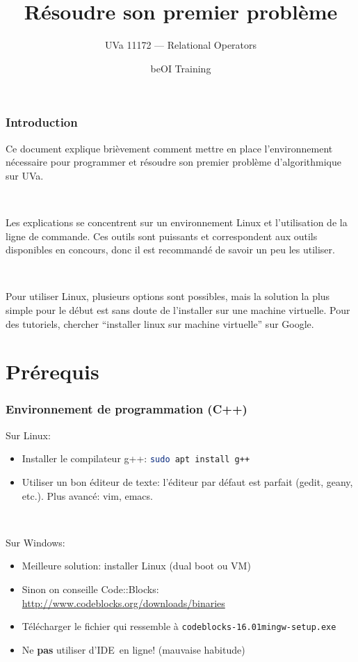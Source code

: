 \documentclass[12pt]{beamer}
\title{Résoudre son premier problème}
\subtitle{UVa 11172 --- Relational Operators}
\author{beOI Training}
\institute{\texttt{[image: ../share/beoi-logo]}}
\date{}
\newcommand{\urlb}[1]{{\color{linkblue}\url{#1}}}
\begin{document}
\maketitle

\begin{frame}
\frametitle{Introduction}
Ce document explique brièvement comment mettre en place l'environnement nécessaire pour programmer et résoudre son premier problème d'algorithmique sur UVa.

~

Les explications se concentrent sur un environnement Linux et l'utilisation de la ligne de commande. Ces outils sont puissants et correspondent aux outils disponibles en concours, donc il est recommandé de savoir un peu les utiliser.

~

Pour utiliser Linux, plusieurs options sont possibles, mais la solution la plus simple pour le début est sans doute de l'installer sur une machine virtuelle. Pour des tutoriels, chercher ``installer linux sur machine virtuelle'' sur Google.
\end{frame}


\section{Prérequis}

\edef\hc{\string:}
\begin{frame}
\frametitle{Environnement de programmation (C++)}
Sur Linux:
\begin{itemize}
\item Installer le compilateur g++: \lstinline[language=bash]|sudo apt install g++|
\item Utiliser un bon éditeur de texte: l'éditeur par défaut est parfait (gedit, geany, etc.). Plus avancé: vim, emacs.
\end{itemize}

~

Sur Windows:
\begin{itemize}
\item Meilleure solution: installer Linux (dual boot ou VM)
\item Sinon on conseille Code\hc\hc{}Blocks: \urlb{http://www.codeblocks.org/downloads/binaries}
\item Télécharger le fichier qui ressemble à \texttt{codeblocks-16.01mingw-setup.exe}
\item Ne \textbf{pas} utiliser d'IDE en ligne! (mauvaise habitude)
\end{itemize}
\end{frame}
\end{document}
